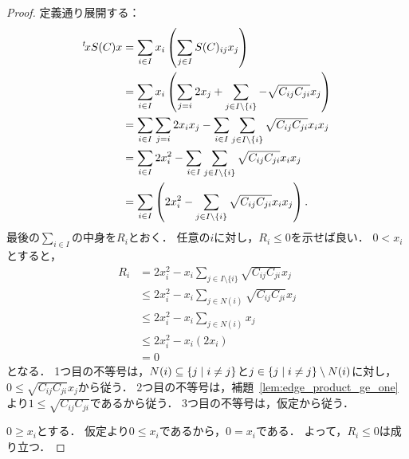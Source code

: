 \begin{proof}
  定義通り展開する：
  \begin{align}
    {}^t\!x S(C) x
    &= \sum_{i \in I} x_i \left( \sum_{j \in I} S(C)_{ij} x_j \right) \\
    &= \sum_{i \in I} x_i \left( \sum_{j = i} 2 x_j + \sum_{j \in I \setminus \{i\}} -\sqrt{C_{ij} C_{ji}} x_j \right) \\
    &= \sum_{i \in I} \sum_{j = i} 2 x_i x_j - \sum_{i \in I} \sum_{j \in I \setminus \{i\}} \sqrt{C_{ij} C_{ji}} x_i x_j \\
    &= \sum_{i \in I} 2 x_i ^ 2 - \sum_{i \in I} \sum_{j \in I \setminus \{i\}} \sqrt{C_{ij} C_{ji}} x_i x_j \\
    &= \sum_{i \in I} \left( 2 x_i ^ 2 - \sum_{j \in I \setminus \{i\}} \sqrt{C_{ij} C_{ji}} x_i x_j \right).
  \end{align}
  最後の$\sum_{i \in I}$の中身を$R_i$とおく．
  任意の$i$に対し，$R_i \le 0$を示せば良い．
  $0 < x_i$とすると，
  \begin{align}
    R_i
    &= 2 x_i ^ 2 - x_i  \sum_{j \in I \setminus \{i\}} \sqrt{C_{ij} C_{ji}} x_j \\
    &\le 2 x_i ^ 2 - x_i \sum_{j \in N(i)} \sqrt{C_{ij} C_{ji}} x_j \\
    &\le 2 x_i ^ 2 - x_i \sum_{j \in N(i)} x_j \\
    &\le 2 x_i ^ 2 - x_i (2 x_i) \\
    &= 0
  \end{align}
  となる．
  1つ目の不等号は，$N(i) \subseteq \left\lbrace j \mathrel{} \middle| \mathrel{} i \ne j \right\rbrace$と$j \in \left\lbrace j \mathrel{} \middle| \mathrel{} i \ne j \right\rbrace \setminus N(i)$に対し，$0 \le \sqrt{C_{ij} C_{ji}} x_j$から従う．
  2つ目の不等号は，補題~\ref{lem:edge_product_ge_one}より$1 \le \sqrt{C_{ij} C_{ji}}$であるから従う．
  3つ目の不等号は，仮定から従う．

  $0 \ge x_i$とする．
  仮定より$0 \le x_i$であるから，$0 = x_i$である．
  よって，$R_i \le 0$は成り立つ．
\end{proof}